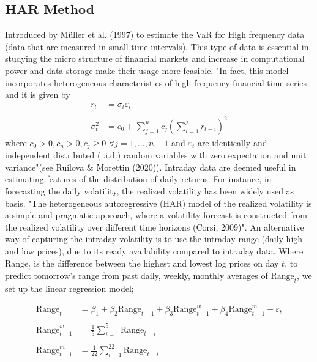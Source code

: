 \documentclass[a4paper,11pt,oneside]{book}
\begin{document}
\subsection{HAR Method}
Introduced by Müller et al. (1997) to estimate the VaR for High frequency data (data that are measured in small time intervals). This type of data is essential in studying the micro structure of financial markets and  increase in computational power and data storage make their usage more feasible. "In fact, this model incorporates
heterogeneous characteristics of high frequency financial time series and it is given by 
\begin{equation}
\begin{aligned}
r_t &= \sigma_t\varepsilon_t
\\
\\
\sigma_t^2 &= c_0 + \sum_{j=1}^{n}c_j\left(\sum_{i=1}^{j}r_{t-i}\right)^2
\label{3}
\end{aligned}
\end{equation}
where $c_0>0, c_n > 0, c_j \ge 0$ $\forall j = 1,...,n-1$ and $\varepsilon_t$ are identically and independent distributed (i.i.d.) random variables with zero expectation and unit variance"(see Ruilova \& Morettin (2020)).
\newline
\newline
Intraday data are deemed useful in estimating features of the distribution of daily returns. For
instance, in forecasting the daily volatility, the realized volatility has been widely used as basis. "The heterogeneous autoregressive (HAR) model of the realized
volatility is a simple and pragmatic approach, where a
volatility forecast is constructed from the realized volatility over different time horizons (Corsi, 2009)". An alternative way of
capturing the intraday volatility is to use the intraday range (daily high and low prices), due to its ready availability compared to  intraday data. Where $\text{Range}_{t}$
is the difference between the highest and
lowest log prices on day $t$, to predict tomorrow's range from past daily, weekly, monthly averages of $\text{Range}_{t}$, we set up the linear regression model;

\begin{equation}
\begin{aligned}
\text{Range}_{t}&=\beta_1+\beta_{2}\text{Range}_{t-1} + \beta_{3}\text{Range}^{w}_{t-1} + \beta_{4}\text{Range}^{m}_{t-1} + \varepsilon_t
\\
\\
\text{Range}^{w}_{t-1}&=\frac{1}{5}\sum_{i=1}^{5}\text{Range}_{t-i}
\\
\\
\text{Range}^{m}_{t-1}&=\frac{1}{22}\sum_{i=1}^{22}\text{Range}_{t-i}
\label{4}
\end{aligned}
\end{equation}
\end{document}
